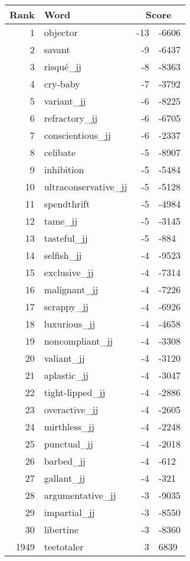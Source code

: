 \begin{longtable}[!htbp]{| rlr@{.}l |}
    \hline
    \textbf{Rank} & \textbf{Word} & \multicolumn{2}{c|}{\textbf{Score}} \\
    \hline
    \endhead
    1 & objector & -13 & -6606 \\
    2 & savant & -9 & -6437 \\
    3 & risqué\_jj & -8 & -8363 \\
    4 & cry-baby & -7 & -3792 \\
    5 & variant\_jj & -6 & -8225 \\
    6 & refractory\_jj & -6 & -6705 \\
    7 & conscientious\_jj & -6 & -2337 \\
    8 & celibate & -5 & -8907 \\
    9 & inhibition & -5 & -5484 \\
    10 & ultraconservative\_jj & -5 & -5128 \\
    11 & spendthrift & -5 & -4984 \\
    12 & tame\_jj & -5 & -3145 \\
    13 & tasteful\_jj & -5 & -884 \\
    14 & selfish\_jj & -4 & -9523 \\
    15 & exclusive\_jj & -4 & -7314 \\
    16 & malignant\_jj & -4 & -7226 \\
    17 & scrappy\_jj & -4 & -6926 \\
    18 & luxurious\_jj & -4 & -4658 \\
    19 & noncompliant\_jj & -4 & -3308 \\
    20 & valiant\_jj & -4 & -3120 \\
    21 & aplastic\_jj & -4 & -3047 \\
    22 & tight-lipped\_jj & -4 & -2886 \\
    23 & overactive\_jj & -4 & -2605 \\
    24 & mirthless\_jj & -4 & -2248 \\
    25 & punctual\_jj & -4 & -2018 \\
    26 & barbed\_jj & -4 & -612 \\
    27 & gallant\_jj & -4 & -321 \\
    28 & argumentative\_jj & -3 & -9035 \\
    29 & impartial\_jj & -3 & -8550 \\
    30 & libertine & -3 & -8360 \\
    1949 & teetotaler & 3 & 6839 \\

\end{longtable}
